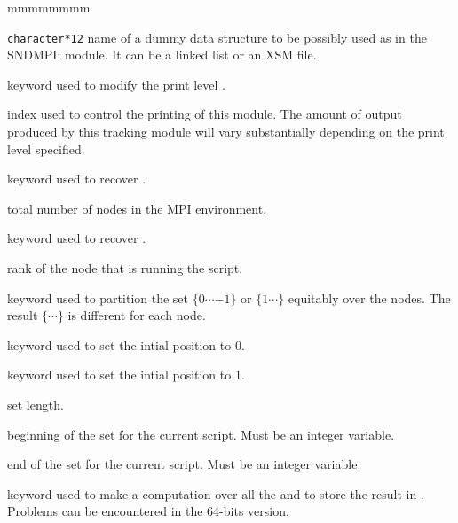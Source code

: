 \begin{ListeDeDescription}{mmmmmmmm}

\item[\dusa{NAME}] {\tt character*12} name of a dummy data
structure to be possibly used as  in the SNDMPI: module. It can be a linked list or an XSM file.

\item[\moc{EDIT}] keyword used to modify the print level .

\item[\dusa{iprint}] index used to control the printing of this module. The
amount of output produced by this tracking module will vary substantially
depending on the print level specified.

\item[\moc{WORLD-SIZE}] keyword used to recover .

\item[\dusa{ncpu}] total number of nodes in the MPI environment.

\item[\moc{MY-ID}] keyword used to recover .

\item[\dusa{rank}] rank of the node that is running the script.

\item[\moc{SETLOOP}] keyword used to partition the set $\{0\cdots$$-1\}$ or $\{1\cdots$$\}$ equitably over the nodes. The result $\{$$\cdots$$\}$ is different for each node.

\item[\moc{B0}] keyword used to set the intial position to 0.

\item[\moc{B1}] keyword used to set the intial position to 1.

\item[\dusa{len}] set length.

\item[\dusa{beg}] beginning of the set for the current script. Must be an integer variable.

\item[\dusa{end}] end of the set for the current script. Must be an integer variable.

\item[\moc{ALLREDUCE}] keyword used to make a computation over all the  and to store the result in . Problems can be encountered in the 64-bits version.


\end{ListeDeDescription}

